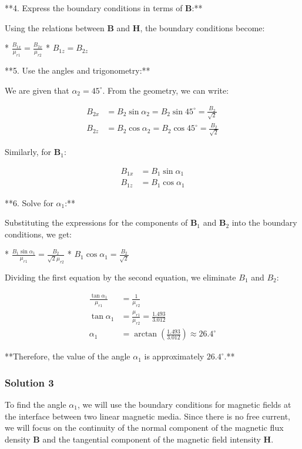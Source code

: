 \documentclass{article}
\begin{document}
**4. Express the boundary conditions in terms of $\mathbf{B}$:**

Using the relations between $\mathbf{B}$ and $\mathbf{H}$, the boundary conditions become:

* $\frac{B_{1x}}{\mu_{r1}} = \frac{B_{2x}}{\mu_{r2}}$
* $B_{1z} = B_{2z}$

**5. Use the angles and trigonometry:**

We are given that $\alpha_2 = 45^\circ$.  From the geometry, we can write:

\begin{align*}
B_{2x} &= B_2 \sin \alpha_2 = B_2 \sin 45^\circ = \frac{B_2}{\sqrt{2}}\\
B_{2z} &= B_2 \cos \alpha_2 = B_2 \cos 45^\circ = \frac{B_2}{\sqrt{2}}
\end{align*}

Similarly, for $\mathbf{B}_1$:

\begin{align*}
B_{1x} &= B_1 \sin \alpha_1 \\
B_{1z} &= B_1 \cos \alpha_1 
\end{align*}

**6. Solve for $\alpha_1$:**

Substituting the expressions for the components of $\mathbf{B}_1$ and $\mathbf{B}_2$ into the boundary conditions, we get:

* $\frac{B_1 \sin \alpha_1}{\mu_{r1}} = \frac{B_2}{\sqrt{2} \mu_{r2}}$
* $B_1 \cos \alpha_1  = \frac{B_2}{\sqrt{2}}$

Dividing the first equation by the second equation, we eliminate $B_1$ and $B_2$:

\begin{align*}
\frac{\tan \alpha_1}{\mu_{r1}} &= \frac{1}{\mu_{r2}} \\
\tan \alpha_1 &= \frac{\mu_{r1}}{\mu_{r2}} = \frac{1.493}{3.012} \\
\alpha_1 &= \arctan \left( \frac{1.493}{3.012} \right) \approx 26.4^\circ
\end{align*}

**Therefore, the value of the angle $\alpha_1$ is approximately $26.4^\circ$.**

\subsubsection{Solution 3}
To find the angle $\alpha_1$, we will use the boundary conditions for magnetic fields at the interface between two linear magnetic media. Since there is no free current, we will focus on the continuity of the normal component of the magnetic flux density $\mathbf{B}$ and the tangential component of the magnetic field intensity $\mathbf{H}$.
\end{document}
